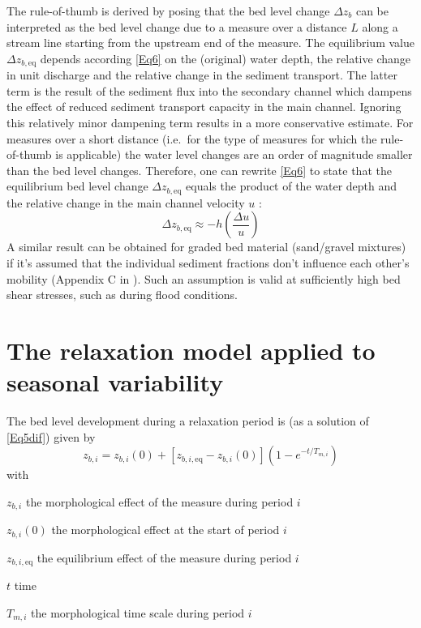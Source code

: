 The rule-of-thumb is derived by posing that the bed level change $\Delta z_b$ can be interpreted as the bed level change due to a measure over a distance $L$ along a stream line starting from the upstream end of the measure.
The equilibrium value $\Delta z_{b,\text{eq}}$ depends according \autoref{Eq6} on the (original) water depth, the relative change in unit discharge and the relative change in the sediment transport.
The latter term is the result of the sediment flux into the secondary channel which dampens the effect of reduced sediment transport capacity in the main channel.
Ignoring this relatively minor dampening term results in a more conservative estimate.
For measures over a short distance (i.e.~for the type of measures for which the rule-of-thumb is applicable) the water level changes are an order of magnitude smaller than the bed level changes.
Therefore, one can rewrite \autoref{Eq6} to state that the equilibrium bed level change $\Delta z_{b,\text{eq}}$ equals the product of the water depth and the relative change in the main channel velocity $u$ :
%
\begin{equation}
\Delta z_{b,\text{eq}} \approx -h \left ( \frac{\Delta u}{u} \right )
\label{Eq6v2}
\end{equation}
%
A similar result can be obtained for graded bed material (sand/gravel mixtures) if it's assumed that the individual sediment fractions don't influence each other's mobility (Appendix C in \citet{Waterdienst2008}).
Such an assumption is valid at sufficiently high bed shear stresses, such as during flood conditions.

\section{The relaxation model applied to seasonal variability}

The bed level development during a relaxation period is (as a solution of \autoref{Eq5dif}) given by
%
\begin{equation}
z_{b,i} = z_{b,i} (0) + [z_{b,i,\text{eq}} - z_{b,i}(0)](1 - e^{-t/T_{m,i}})
\label{Eq7}
\end{equation}
%
with
%
\begin{symbollist}
\item[$z_{b,i}$]  the morphological effect of the measure during period $i$
\item[$z_{b,i}(0)$]  the morphological effect at the start of period $i$
\item[$z_{b,i,\text{eq}}$]  the equilibrium effect of the measure during period $i$
\item[$t$]  time
\item[$T_{m,i}$]  the morphological time scale during period $i$
\end{symbollist}


